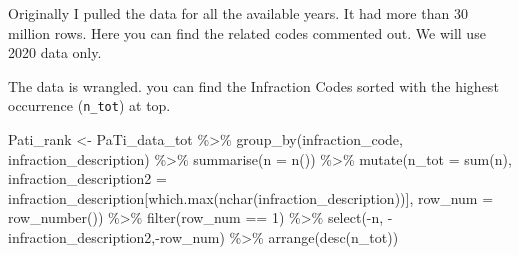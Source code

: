 \documentclass[
]{article}
\newenvironment{Shaded}{\begin{snugshade}}{\end{snugshade}}
\newcommand{\AttributeTok}[1]{\textcolor[rgb]{0.77,0.63,0.00}{#1}}
\newcommand{\CommentTok}[1]{\textcolor[rgb]{0.56,0.35,0.01}{\textit{#1}}}
\newcommand{\DecValTok}[1]{\textcolor[rgb]{0.00,0.00,0.81}{#1}}
\newcommand{\FunctionTok}[1]{\textcolor[rgb]{0.00,0.00,0.00}{#1}}
\newcommand{\NormalTok}[1]{#1}
\newcommand{\OtherTok}[1]{\textcolor[rgb]{0.56,0.35,0.01}{#1}}
\newcommand{\SpecialCharTok}[1]{\textcolor[rgb]{0.00,0.00,0.00}{#1}}
\begin{document}
Originally I pulled the data for all the available years. It had more
than 30 million rows. Here you can find the related codes commented out.
We will use 2020 data only.

\begin{Shaded}
\end{Shaded}

The data is wrangled. you can find the Infraction Codes sorted with the
highest occurrence (\texttt{n\_tot}) at top.

\begin{Shaded}
\begin{Highlighting}[]
\NormalTok{Pati\_rank }\OtherTok{\textless{}{-}}\NormalTok{ PaTi\_data\_tot }\SpecialCharTok{\%\textgreater{}\%} 
  \FunctionTok{group\_by}\NormalTok{(infraction\_code, infraction\_description) }\SpecialCharTok{\%\textgreater{}\%} 
  \FunctionTok{summarise}\NormalTok{(}\AttributeTok{n =} \FunctionTok{n}\NormalTok{()) }\SpecialCharTok{\%\textgreater{}\%} 
  \FunctionTok{mutate}\NormalTok{(}\AttributeTok{n\_tot =} \FunctionTok{sum}\NormalTok{(n),}
         \AttributeTok{infraction\_description2 =}\NormalTok{ infraction\_description[}\FunctionTok{which.max}\NormalTok{(}\FunctionTok{nchar}\NormalTok{(infraction\_description))],}
         \AttributeTok{row\_num =} \FunctionTok{row\_number}\NormalTok{()) }\SpecialCharTok{\%\textgreater{}\%} 
  \FunctionTok{filter}\NormalTok{(row\_num }\SpecialCharTok{==} \DecValTok{1}\NormalTok{) }\SpecialCharTok{\%\textgreater{}\%} 
  \FunctionTok{select}\NormalTok{(}\SpecialCharTok{{-}}\NormalTok{n, }\SpecialCharTok{{-}}\NormalTok{infraction\_description2,}\SpecialCharTok{{-}}\NormalTok{row\_num) }\SpecialCharTok{\%\textgreater{}\%} 
  \FunctionTok{arrange}\NormalTok{(}\FunctionTok{desc}\NormalTok{(n\_tot))}
\end{Highlighting}
\end{Shaded}
\end{document}
